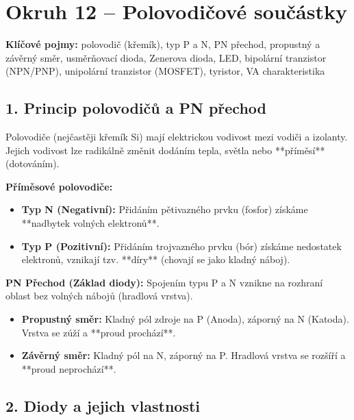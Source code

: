 \documentclass[a4paper,10pt]{article}
\begin{document}
\section*{\large Okruh 12 – Polovodičové součástky}

\begin{pojmybox}
\textbf{Klíčové pojmy:}
polovodič (křemík), typ P a N, PN přechod, propustný a závěrný směr, usměrňovací dioda, Zenerova dioda, LED, bipolární tranzistor (NPN/PNP), unipolární tranzistor (MOSFET), tyristor, VA charakteristika
\end{pojmybox}

\begin{vysvetlenibox}

\subsection*{1. Princip polovodičů a PN přechod}

Polovodiče (nejčastěji křemík Si) mají elektrickou vodivost mezi vodiči a izolanty. Jejich vodivost lze radikálně změnit dodáním tepla, světla nebo **příměsí** (dotováním).

\textbf{Příměsové polovodiče:}
\begin{itemize}
    \item \textbf{Typ N (Negativní):} Přidáním pětivazného prvku (fosfor) získáme **nadbytek volných elektronů**.
    \item \textbf{Typ P (Pozitivní):} Přidáním trojvazného prvku (bór) získáme nedostatek elektronů, vznikají tzv. **díry** (chovají se jako kladný náboj).
\end{itemize}

\textbf{PN Přechod (Základ diody):} Spojením typu P a N vznikne na rozhraní oblast bez volných nábojů (hradlová vrstva).
\begin{itemize}
    \item \textbf{Propustný směr:} Kladný pól zdroje na P (Anoda), záporný na N (Katoda). Vrstva se zúží a **proud prochází**.
    \item \textbf{Závěrný směr:} Kladný pól na N, záporný na P. Hradlová vrstva se rozšíří a **proud neprochází**.
\end{itemize}

\subsection*{2. Diody a jejich vlastnosti}


\end{vysvetlenibox}
\end{document}
